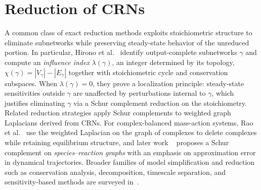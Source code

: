 \documentclass{article}
\theoremstyle{plain}
\theoremstyle{definition}
\theoremstyle{remark}
\newcommand{\<}{\langle}
\renewcommand{\>}{\rangle}
\begin{document}
\section*{Reduction of CRNs}
A common class of exact reduction methods exploits stoichiometric structure to eliminate subnetworks while preserving steady-state behavior of the unreduced portion. 
In particular, Hirono et al.~\cite{Hirono2021} identify output-complete subnetworks $\gamma$ and compute an \emph{influence index} $\lambda(\gamma)$, an integer determined by its topology, $\chi(\gamma)=|V_\gamma|-|E_\gamma|$ together with stoichiometric cycle and conservation subspaces. 
When $\lambda(\gamma)=0$, they prove a localization principle: steady-state sensitivities outside $\gamma$ are unaffected by perturbations internal to $\gamma$, which justifies eliminating $\gamma$ via a Schur complement reduction on the stoichiometry.
Related reduction strategies apply Schur complements to weighted graph Laplacians derived from CRNs. 
For complex-balanced mass-action systems, Rao et al.~\cite{Rao2013} use the weighted Laplacian on the graph of complexes to delete complexes while retaining equilibrium structure, and later work ~\cite{Gasparyan2025.10.15.682662} proposes a Schur complement on \emph{species--reaction graphs} with an emphasis on approximation error in dynamical trajectories. 
Broader families of model simplification and reduction such as conservation analysis, decomposition, timescale separation, and sensitivity-based methods are surveyed in~\cite{Snowden2017}.


\end{document}

